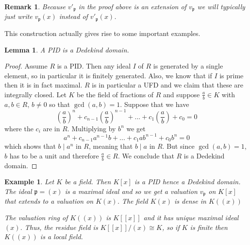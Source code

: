 \documentclass{article}
\newtheorem{lemma}{Lemma}[section]
\newtheorem{example}{Example}[section]
\newtheorem{remark}{Remark}[section]
\newcommand{\mfrak}[1]{\mathfrak{#1}}
\begin{document}
\begin{remark}
    Because $v'_\mfrak p$ in the proof above is an extension of $v_\mfrak p$ we will typically just write $v_\mfrak p(x)$ instead of $v'_\mfrak p(x)$.
\end{remark}

This construction actually gives rise to some important examples.
 
\begin{lemma}
    A PID is a Dedekind domain.
\end{lemma}
\begin{proof}
    Assume $R$ is a PID. Then any ideal $I$ of $R$ is generated by a single element, so in particular it is finitely generated. Also, we know that if $I$ is prime then it is in fact maximal. $R$ is in particular a UFD and we claim that these are integrally closed. Let $K$ be the field of fractions of $R$ and suppose $\frac{a}{b} \in K$ with $a,b \in R$, $b \neq 0$ so that $\gcd(a, b) = 1$. Suppose that we have
    $$(\frac{a}{b})^n + c_{n-1}(\frac{a}{b})^{n-1} + ... + c_{1}(\frac{a}{b}) + c_0 = 0$$
    where the $c_i$ are in $R$. Multiplying by $b^n$ we get
    $$a^n + c_{n-1}a^{n-1}b + ... + c_{1}ab^{n-1} + c_0 b^n = 0$$
    which shows that $b \mid a^n$ in $R$, meaning that $b \mid a$ in $R$. But since $\gcd(a,b) = 1$, $b$ has to be a unit and therefore $\frac{a}{b} \in R$. We conclude that $R$ is a Dedekind domain. 
\end{proof}


\begin{example}
    Let $K$ be a field. Then $K[x]$ is a PID hence a Dedekind domain. The ideal $\mfrak p = (x)$ is a maximal ideal and so we get a valuation $v_\mfrak p$ on $K[x]$ that extends to a valuation on $K(x)$. The field $K(x)$ is dense in $K((x))$ 
    
    The valuation ring of $K((x))$ is $K[[x]]$ and it has unique maximal ideal $(x)$. Thus, the residue field is $K[[x]] / (x) \cong K$, so if $K$ is finite then $K((x))$ is a local field. 
\end{example}
\end{document}
